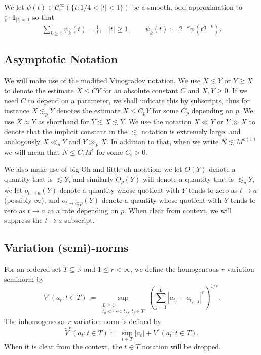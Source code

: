 \documentclass[12pt]{amsart}
\numberwithin{equation}{section}
\theoremstyle{definition}
\begin{document}
We let $\psi(t) \in \mathcal{C}_c^{\infty}(\{ t : 1/4 < |t| < 1\})$ be a smooth, odd approximation to $\frac{1}{t} \cdot  \mathbf{1}_{|t| \approx 1} $ so that
\begin{align}
\sum_{k \geq 1} \psi_k(t) = \frac{1}{t}, \; \; \; |t| \geq 1, \qquad \psi_k(t) := 2^{-k} \psi(t 2^{-k}).
\end{align}


\subsection{Asymptotic Notation}\label{sss:O}
We will make use of the modified Vinogradov notation. We use $X \lesssim Y$ or $Y \gtrsim X$ to denote
the estimate $X \leq CY$ for an absolute constant $C$ and $X, Y \geq 0.$  If we need $C$ to depend on a
parameter, we shall indicate this by subscripts, thus for instance $X \lesssim_p Y$ denotes the estimate $X \leq C_p Y$ for some $C_p$ depending on $p$. We use $X \approx Y$ as shorthand for $Y \lesssim X \lesssim Y$. We use the notation $X \ll Y$ or $Y \gg X$ to denote that the implicit constant in the $\lesssim$ notation is extremely large, and analogously $X \ll_p Y$ and $Y \gg_p X$. In addition to that, when we write $N \lesssim M^{o(1)}$ we will mean that $N \leq C_{\epsilon}M^{\epsilon}$ for some $C_{\epsilon}>0.$

We also make use of big-Oh and little-oh notation: we let $O(Y)$  denote a quantity that is $\lesssim Y$, and similarly
$O_p(Y )$ will denote a quantity that is $\lesssim_p Y$; we let $o_{t \to a}(Y)$
denote a quantity whose quotient with $Y$ tends to zero as $t \to a$ (possibly $\infty$), and
$o_{t \to a;p}(Y)$
denote a quantity whose quotient with $Y$ tends to zero as $t \to a$ at a rate depending on $p$. When clear from context, we will suppress the $t \to a$ subscript.
\subsection{Variation (semi)-norms}
For an ordered set $T \subseteq \mathbb{R}$ and $1 \leq r < \infty$,
we define the homogeneous $r$-variation seminorm by
\[
V^r(a_t : t \in T)
:=
\sup_{\substack{L \geq 1\\
t_0 < \cdots < t_L,\; t_j \in T}}
\left(
\sum_{j=1}^{L}
|a_{t_j}-a_{t_{j-1}}|^r
\right)^{1/r}.
\]
The inhomogeneous $r$-variation norm is defined by
\[
\widetilde{V}^r(a_t : t \in T)
:=
\sup_{t \in T}|a_t| + V^r(a_t : t \in T).
\]
When it is clear from the context, the $t \in T$ notation will be dropped.
\end{document}

